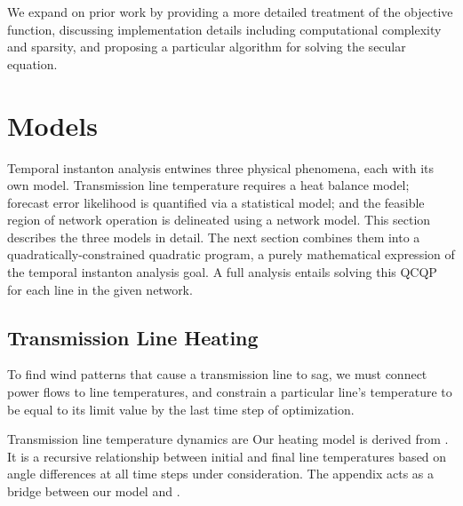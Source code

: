 \documentclass[journal,twoside]{IEEEtran}
\begin{document}
We expand on prior work by providing a more detailed treatment of the objective function, discussing implementation details including computational complexity and sparsity, and proposing a particular algorithm for solving the secular equation.

\section{Models}\label{sec:models}
Temporal instanton analysis entwines three physical phenomena, each with its own model. Transmission line temperature requires a heat balance model; forecast error likelihood is quantified via a statistical model; and the feasible region of network operation is delineated using a network model. This section describes the three models in detail. The next section combines them into a quadratically-constrained quadratic program, a purely mathematical expression of the temporal instanton analysis goal. A full analysis entails solving this QCQP for each line in the given network.

\subsection{Transmission Line Heating}\label{sec:models-heat}
To find wind patterns that cause a transmission line to sag, we must connect power flows to line temperatures, and constrain a particular line's temperature to be equal to its limit value by the last time step of optimization.

Transmission line temperature dynamics are  Our heating model is derived from \cite{ieee2013}. It is a recursive relationship between initial and final line temperatures based on angle differences at all time steps under consideration. The appendix acts as a bridge between our model and \cite{ieee2013}.
\end{document}

